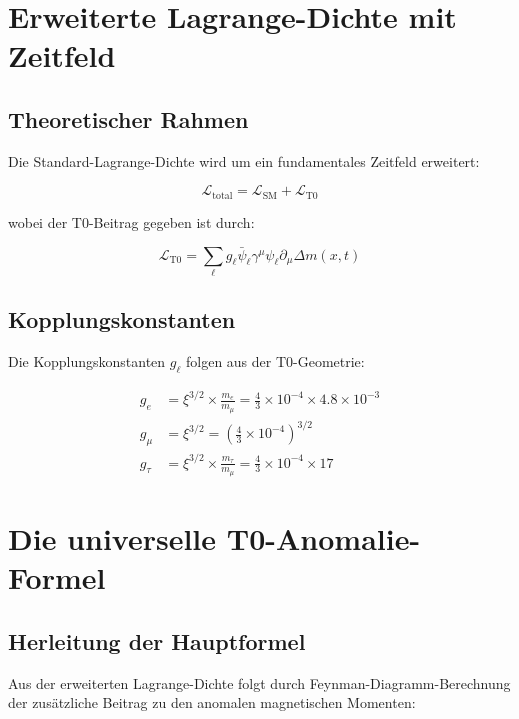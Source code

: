 \documentclass[12pt,a4paper]{article}
\newcommand{\xipar}{\xi}
\newcommand{\Deltam}{\Delta m}
\begin{document}
	\section{Erweiterte Lagrange-Dichte mit Zeitfeld}
	
	\subsection{Theoretischer Rahmen}
	
	Die Standard-Lagrange-Dichte wird um ein fundamentales Zeitfeld erweitert:
	
	\begin{equation}
		\mathcal{L}_{\text{total}} = \mathcal{L}_{\text{SM}} + \mathcal{L}_{\text{T0}}
	\end{equation}
	
	wobei der T0-Beitrag gegeben ist durch:
	
	\begin{equation}
		\mathcal{L}_{\text{T0}} = \sum_\ell g_\ell \bar{\psi}_\ell \gamma^\mu \psi_\ell \partial_\mu \Deltam(x,t)
	\end{equation}
	
	\subsection{Kopplungskonstanten}
	
	Die Kopplungskonstanten $g_\ell$ folgen aus der T0-Geometrie:
	
	\begin{align}
		g_e &= \xipar^{3/2} \times \frac{m_e}{m_\mu} = \frac{4}{3} \times 10^{-4} \times 4.8 \times 10^{-3} \\
		g_\mu &= \xipar^{3/2} = \left(\frac{4}{3} \times 10^{-4}\right)^{3/2} \\
		g_\tau &= \xipar^{3/2} \times \frac{m_\tau}{m_\mu} = \frac{4}{3} \times 10^{-4} \times 17
	\end{align}
	
	\section{Die universelle T0-Anomalie-Formel}
	
	\subsection{Herleitung der Hauptformel}
	
	Aus der erweiterten Lagrange-Dichte folgt durch Feynman-Diagramm-Berechnung der zusätzliche Beitrag zu den anomalen magnetischen Momenten:
	
\end{document}
